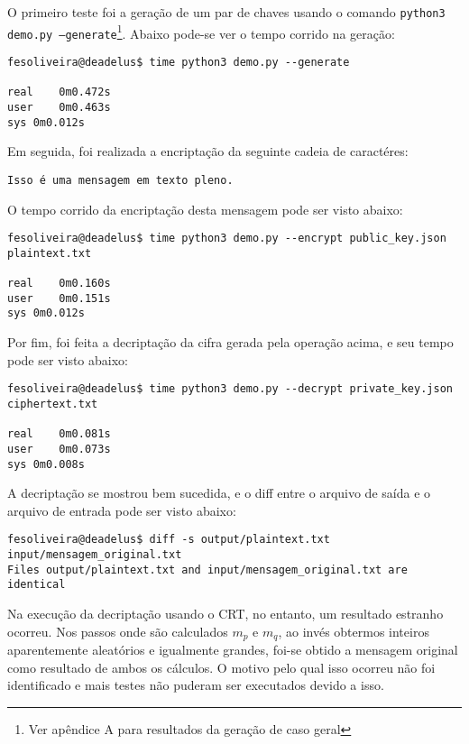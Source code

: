\documentclass[10pt]{article}
\begin{document}
        O primeiro teste foi a geração de um par de chaves usando o comando \texttt{python3 demo.py --generate}\footnote{Ver apêndice A para resultados da geração de caso geral}. Abaixo pode-se ver o tempo corrido na geração:

        \begin{verbatim}
fesoliveira@deadelus$ time python3 demo.py --generate

real    0m0.472s
user    0m0.463s
sys 0m0.012s            
        \end{verbatim}

        Em seguida, foi realizada a encriptação da seguinte cadeia de caractéres:

        \begin{verbatim}
Isso é uma mensagem em texto pleno.            
        \end{verbatim}

        O tempo corrido da encriptação desta mensagem pode ser visto abaixo:

        \begin{verbatim}
fesoliveira@deadelus$ time python3 demo.py --encrypt public_key.json plaintext.txt 

real    0m0.160s
user    0m0.151s
sys 0m0.012s            
        \end{verbatim}

        Por fim, foi feita a decriptação da cifra gerada pela operação acima, e seu tempo pode ser visto abaixo:

        \begin{verbatim}
fesoliveira@deadelus$ time python3 demo.py --decrypt private_key.json ciphertext.txt 

real    0m0.081s
user    0m0.073s
sys 0m0.008s            
        \end{verbatim}

        A decriptação se mostrou bem sucedida, e o diff entre o arquivo de saída e o arquivo de entrada pode ser visto abaixo:

        \begin{verbatim}
fesoliveira@deadelus$ diff -s output/plaintext.txt input/mensagem_original.txt
Files output/plaintext.txt and input/mensagem_original.txt are identical            
        \end{verbatim}

        Na execução da decriptação usando o CRT, no entanto, um resultado estranho ocorreu. Nos passos onde são calculados $m_p$ e $m_q$, ao invés obtermos inteiros aparentemente aleatórios e igualmente grandes, foi-se obtido a mensagem original como resultado de ambos os cálculos. O motivo pelo qual isso ocorreu não foi identificado e mais testes não puderam ser executados devido a isso.
\end{document}
